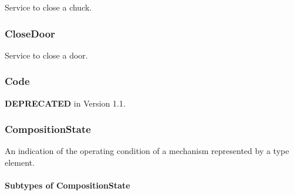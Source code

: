 Service to close a chuck.


\subsubsection{CloseDoor}
\label{sec:CloseDoor}



Service to close a door.


\subsubsection{Code}
\label{sec:Code}



\textbf{DEPRECATED} in Version 1.1.


\subsubsection{CompositionState}
\label{sec:CompositionState}



An indication of the operating condition of a mechanism represented by a  type element.


\paragraph{Subtypes of CompositionState}\mbox{}
\label{sec:Subtypes of CompositionState}


